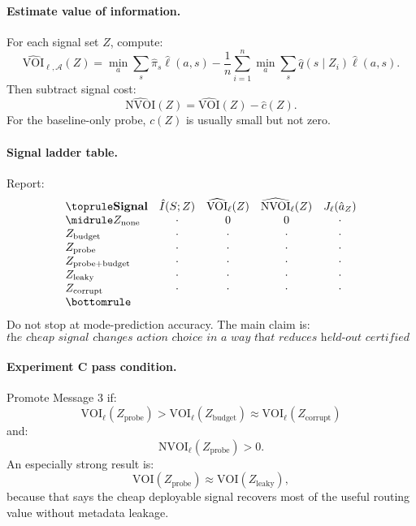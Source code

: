\documentclass{article}
\begin{document}
\paragraph{Estimate value of information.}
For each signal set \(Z\), compute:
\[
    \widehat{\mathrm{VOI}}_{\ell,\mathcal A}(Z)
    =
    \min_a\sum_s\hat\pi_s\hat\ell(a,s)
    -
    \frac1n\sum_{i=1}^n
    \min_a\sum_s\hat q(s\mid Z_i)\hat\ell(a,s).
\]
Then subtract signal cost:
\[
    \widehat{\mathrm{NVOI}}(Z)
    =
    \widehat{\mathrm{VOI}}(Z)-\hat c(Z).
\]
For the baseline-only probe, \(c(Z)\) is usually small but not zero.

\paragraph{Signal ladder table.}
Report:
\[
\begin{array}{lcccc}
\toprule
\textbf{Signal} &
\hat I(S;Z) &
\widehat{\mathrm{VOI}}_{\ell}(Z) &
\widehat{\mathrm{NVOI}}_{\ell}(Z) &
J_\ell(\hat a_Z)\\
\midrule
Z_{\mathrm{none}} & \cdot & 0 & 0 & \cdot\\
Z_{\mathrm{budget}} & \cdot & \cdot & \cdot & \cdot\\
Z_{\mathrm{probe}} & \cdot & \cdot & \cdot & \cdot\\
Z_{\mathrm{probe+budget}} & \cdot & \cdot & \cdot & \cdot\\
Z_{\mathrm{leaky}} & \cdot & \cdot & \cdot & \cdot\\
Z_{\mathrm{corrupt}} & \cdot & \cdot & \cdot & \cdot\\
\bottomrule
\end{array}
\]
Do not stop at mode-prediction accuracy.
The main claim is:
\[
    \textit{the cheap signal changes action choice in a way that reduces held-out
    certified effort.}
\]

\paragraph{Experiment C pass condition.}
Promote Message 3 if:
\[
    \mathrm{VOI}_{\ell}(Z_{\mathrm{probe}})
    >
    \mathrm{VOI}_{\ell}(Z_{\mathrm{budget}})
    \approx
    \mathrm{VOI}_{\ell}(Z_{\mathrm{corrupt}})
\]
and:
\[
    \mathrm{NVOI}_{\ell}(Z_{\mathrm{probe}})>0.
\]
An especially strong result is:
\[
    \mathrm{VOI}(Z_{\mathrm{probe}})
    \approx
    \mathrm{VOI}(Z_{\mathrm{leaky}}),
\]
because that says the cheap deployable signal recovers most of the useful routing value
without metadata leakage.
\end{document}
